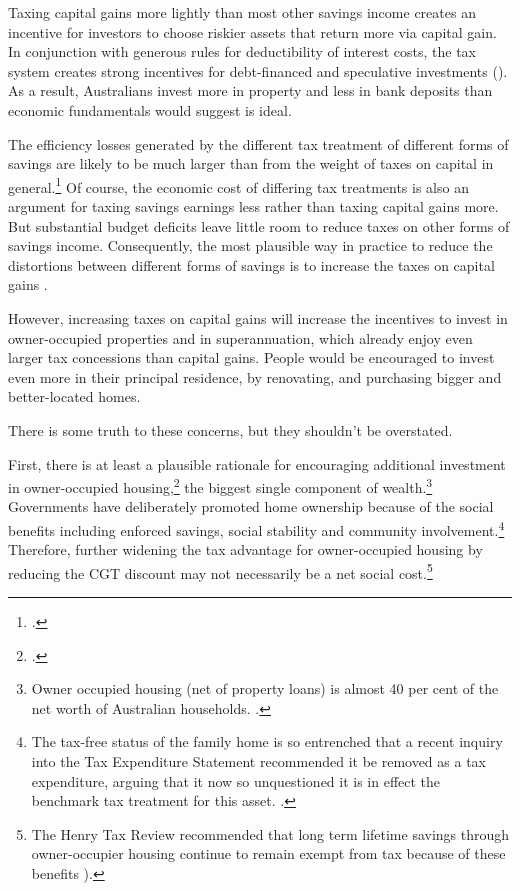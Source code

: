 Taxing capital gains more lightly than most other savings income creates an incentive for investors to choose riskier assets that return more via capital gain. In conjunction with generous rules for deductibility of interest costs, the tax system creates strong incentives for debt-financed and speculative investments (). As a result, Australians invest more in property and less in bank deposits than economic fundamentals would suggest is ideal.

The efficiency losses generated by the different tax treatment of different forms of savings are likely to be much larger than from the weight of taxes on capital in general.\footcites[][16]{Ingles2009TaxEquity}[][22]{Ingles2015}  Of course, the economic cost of differing tax treatments is also an argument for taxing savings earnings less rather than taxing capital gains more. But substantial budget deficits leave little room to reduce taxes on other forms of savings income. Consequently, the most plausible way in practice to reduce the distortions between different forms of savings is to increase the taxes on capital gains . 

However, increasing taxes on capital gains will increase the incentives to invest in owner-occupied properties and in superannuation, which already enjoy even larger tax concessions than capital gains. People would be encouraged to invest even more in their principal residence, by renovating, and purchasing bigger and better-located homes. 

There is some truth to these concerns, but they shouldn’t be overstated. 

First, there is at least a plausible rationale\label{subsubsect:plausible-rational-for-encouraging-investment-in-owner-occupied-housing}
 for encouraging additional investment in owner-occupied housing,\footcite[][43--45]{DaleyMcGannonSavageEtAl2013BalancingBudgets} the biggest single component of wealth.\footnote{Owner occupied housing (net of property loans) is almost 40 per cent of the net worth of Australian households. \textcite[See:][]{ABS2015HousingFinance}.} Governments have deliberately promoted home ownership because of the social benefits including enforced savings, social stability and community involvement.\footnote{The tax-free status of the family home is so entrenched that a recent inquiry into the Tax Expenditure Statement recommended it be removed as a tax expenditure, arguing that it now so unquestioned it is in effect the benchmark tax treatment for this asset. \textcite[][42]{HouseOfRepresentativesStandingCommitteeonTaxRevenue2015TES}.} Therefore, further widening the tax advantage for owner-occupied housing by reducing the CGT discount may not necessarily be a net social cost.\footnote{The Henry Tax Review recommended that long term lifetime savings through owner-occupier housing continue to remain exempt from tax because of these benefits \textcite[][Part A, p.~4]{HenryTaxReview2010}).}


